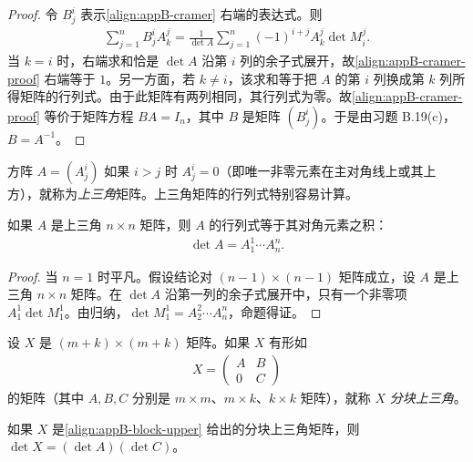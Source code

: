 \documentclass[../../main.tex]{subfiles}
\begin{document}
\begin{proof}
令 $B^i_j$ 表示\eqref{align:appB-cramer} 右端的表达式。则
\begin{align}\label{align:appB-cramer-proof}
\sum_{j=1}^n B^i_j A^j_k=\frac{1}{\det A}\sum_{j=1}^n(-1)^{i+j}A^j_k\det M^j_i.
\end{align}
当 $k=i$ 时，右端求和恰是 $\det A$ 沿第 $i$ 列的余子式展开，故\eqref{align:appB-cramer-proof} 右端等于 $1$。另一方面，若 $k\neq i$，该求和等于把 $A$ 的第 $i$ 列换成第 $k$ 列所得矩阵的行列式。由于此矩阵有两列相同，其行列式为零。故\eqref{align:appB-cramer-proof} 等价于矩阵方程 $BA=I_n$，其中 $B$ 是矩阵 $(B^i_j)$。于是由习题 B.19(c)，$B=A^{-1}$。
\end{proof}

方阵 $A=(A^i_j)$ 如果 $i>j$ 时 $A^i_j=0$（即唯一非零元素在主对角线上或其上方），就称为\emph{上三角}矩阵。上三角矩阵的行列式特别容易计算。

\begin{proposition}\label{proposition:appB-upper-triangular}
如果 $A$ 是上三角 $n\times n$ 矩阵，则 $A$ 的行列式等于其对角元素之积：
\begin{align*}
\det A=A^1_1\cdots A^n_n.
\end{align*}
\end{proposition}

\begin{proof}
当 $n=1$ 时平凡。假设结论对 $(n-1)\times(n-1)$ 矩阵成立，设 $A$ 是上三角 $n\times n$ 矩阵。在 $\det A$ 沿第一列的余子式展开中，只有一个非零项 $A^1_1\det M^1_1$。由归纳，$\det M^1_1=A^2_2\cdots A^n_n$，命题得证。
\end{proof}

设 $X$ 是 $(m+k)\times(m+k)$ 矩阵。如果 $X$ 有形如
\begin{align}\label{align:appB-block-upper}
X=\begin{pmatrix}A&B\\ 0&C\end{pmatrix}
\end{align}
的矩阵（其中 $A,B,C$ 分别是 $m\times m$、$m\times k$、$k\times k$ 矩阵），就称 $X$ \emph{分块上三角}。

\begin{proposition}\label{proposition:appB-block-upper-triangular}
如果 $X$ 是\eqref{align:appB-block-upper} 给出的分块上三角矩阵，则 $\det X=(\det A)(\det C)$。
\end{proposition}
\end{document}

